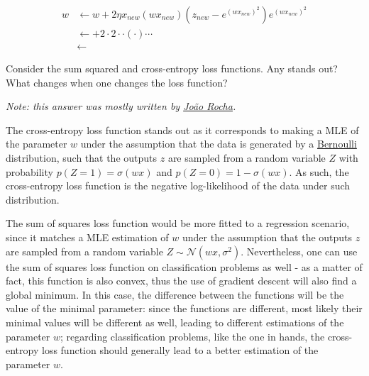 \documentclass[12pt]{article}
\begin{document}
\begin{enumerate}[leftmargin=\labelsep]
\begin{enumerate}
{          \begin{align*}
            w & \leftarrow w + 2\eta x_{new} (w x_{new}) (z_{new} - e^{(w x_{new})^2}) e^{(w x_{new})^2} \\
              & \leftarrow  + 2 \cdot 2 \cdot
             \cdot \left(
             \cdot 
            \right) \cdots                                                                               \\
              & \leftarrow 
          \end{align*}

          }
  \end{enumerate}

  \begin{tcolorbox}[enhanced jigsaw,colback=bg,boxrule=0pt,arc=1pt,halign=center]
    \item Consider the sum squared and cross-entropy loss functions. Any stands out?
    What changes when one changes the loss function?
  \end{tcolorbox}

  \textit{Note: this answer was mostly written by \href{https://github.com/Calhau18}{João Rocha}.}

  The cross-entropy loss function stands out as it corresponds to making a MLE of
  the parameter $w$ under the assumption that the data is generated by a
  \href{https://resumos.leic.pt/pe/va-discretas#distribuição-de-bernoulli}{Bernoulli}
  distribution, such that the outputs $z$ are sampled from a random variable $Z$
  with probability $p(Z = 1) = \sigma(w x)$ and $p(Z = 0) = 1 - \sigma(w x)$.
  As such, the cross-entropy loss function is the negative log-likelihood
  of the data under such distribution.

  The sum of squares loss function would be more fitted to a regression scenario,
  since it matches a MLE estimation of $w$ under the assumption that the outputs
  $z$ are sampled from a random variable $Z \sim \mathcal{N} (wx, \sigma^2)$.
  Nevertheless, one can use the sum of squares loss function on classification problems as well - as
  a matter of fact, this function is also convex, thus the use of gradient descent
  will also find a global minimum. In this case, the difference between the functions
  will be the value of the minimal parameter: since the functions are different,
  most likely their minimal values will be different as well, leading to different
  estimations of the parameter $w$; regarding classification problems, like the one
  in hands, the cross-entropy loss function should generally lead to a better estimation
  of the parameter $w$.

\end{enumerate}
\end{document}
